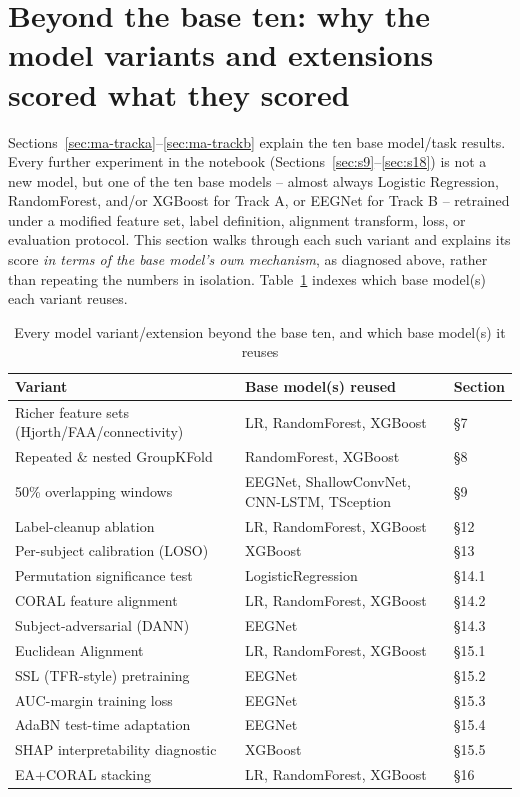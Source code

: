 \documentclass[11pt]{report}
\begin{document}
\section{Beyond the base ten: why the model variants and extensions scored
what they scored}
\label{sec:ma-beyond}
Sections~\ref{sec:ma-tracka}--\ref{sec:ma-trackb} explain the ten base
model/task results. Every further experiment in the notebook
(Sections~\ref{sec:s9}--\ref{sec:s18}) is not a new model, but one of the
ten base models -- almost always Logistic Regression, RandomForest, and/or
XGBoost for Track A, or EEGNet for Track B -- retrained under a modified
feature set, label definition, alignment transform, loss, or evaluation
protocol. This section walks through each such variant and explains its
score \emph{in terms of the base model's own mechanism}, as diagnosed
above, rather than repeating the numbers in isolation.
Table~\ref{tab:ma-beyond-index} indexes which base model(s) each variant
reuses.

\begin{table}[H]
\centering
\caption{Every model variant/extension beyond the base ten, and which base
model(s) it reuses}
\label{tab:ma-beyond-index}
\begin{tabular}{p{5.2cm}p{4.3cm}p{1.6cm}}
\toprule
Variant & Base model(s) reused & Section \\
\midrule
Richer feature sets (Hjorth/FAA/connectivity) & LR, RandomForest, XGBoost & \S7 \\
Repeated \& nested GroupKFold & RandomForest, XGBoost & \S8 \\
50\% overlapping windows & EEGNet, ShallowConvNet, CNN-LSTM, TSception & \S9 \\
Label-cleanup ablation & LR, RandomForest, XGBoost & \S12 \\
Per-subject calibration (LOSO) & XGBoost & \S13 \\
Permutation significance test & LogisticRegression & \S14.1 \\
CORAL feature alignment & LR, RandomForest, XGBoost & \S14.2 \\
Subject-adversarial (DANN) & EEGNet & \S14.3 \\
Euclidean Alignment & LR, RandomForest, XGBoost & \S15.1 \\
SSL (TFR-style) pretraining & EEGNet & \S15.2 \\
AUC-margin training loss & EEGNet & \S15.3 \\
AdaBN test-time adaptation & EEGNet & \S15.4 \\
SHAP interpretability diagnostic & XGBoost & \S15.5 \\
EA+CORAL stacking & LR, RandomForest, XGBoost & \S16 \\
\bottomrule
\end{tabular}
\end{table}
\end{document}
